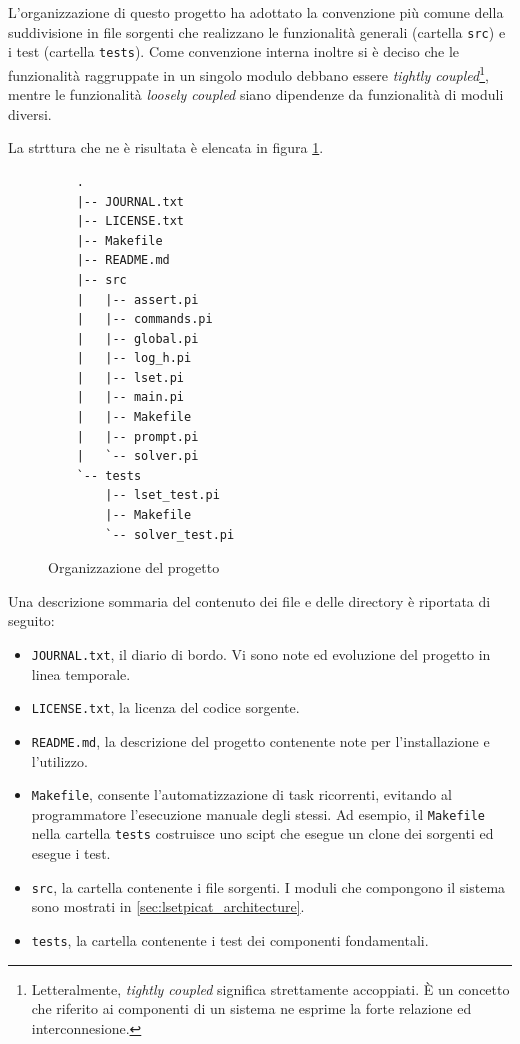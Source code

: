 \documentclass[12pt,a4paper,openright]{book} %
\begin{document}
L'organizzazione di questo progetto ha adottato la convenzione più comune della suddivisione in file sorgenti che realizzano le funzionalità generali (cartella \texttt{src}) e i test (cartella \texttt{tests}). Come convenzione interna inoltre si è deciso che le funzionalità raggruppate in un singolo modulo debbano essere \textit{tightly coupled}\footnote{Letteralmente, \textit{tightly coupled} significa strettamente accoppiati. \`E un concetto che riferito ai componenti di un sistema ne esprime la forte relazione ed interconnesione.}, mentre le funzionalità \textit{loosely coupled} siano dipendenze da funzionalità di moduli diversi.

La strttura che ne è risultata è elencata in figura \ref{fig:proj_folder_structure}.

\begin{figure}[]
	\label{fig:proj_folder_structure}
	\begin{verbatim}
	.
	|-- JOURNAL.txt
	|-- LICENSE.txt
	|-- Makefile
	|-- README.md
	|-- src
	|   |-- assert.pi
	|   |-- commands.pi
	|   |-- global.pi
	|   |-- log_h.pi
	|   |-- lset.pi
	|   |-- main.pi
	|   |-- Makefile
	|   |-- prompt.pi
	|   `-- solver.pi
	`-- tests
	    |-- lset_test.pi
	    |-- Makefile
	    `-- solver_test.pi
	\end{verbatim}
	\caption{Organizzazione del progetto}
\end{figure}

Una descrizione sommaria del contenuto dei file e delle directory è riportata di seguito:
\begin{itemize}
	\item \texttt{JOURNAL.txt}, il diario di bordo. Vi sono note ed evoluzione del progetto in linea temporale.
	\item \texttt{LICENSE.txt}, la licenza del codice sorgente.
	\item \texttt{README.md}, la descrizione del progetto contenente note per l'installazione e l'utilizzo.
	\item \texttt{Makefile}, consente l'automatizzazione di task ricorrenti, evitando al programmatore l'esecuzione manuale degli stessi. Ad esempio, il \texttt{Makefile} nella cartella \texttt{tests} costruisce uno scipt che esegue un clone dei sorgenti ed esegue i test.
	\item \texttt{src}, la cartella contenente i file sorgenti. I moduli che compongono il sistema sono mostrati in \ref{sec:lsetpicat_architecture}.
	\item \texttt{tests}, la cartella contenente i test dei componenti fondamentali.
\end{itemize}
\end{document}
